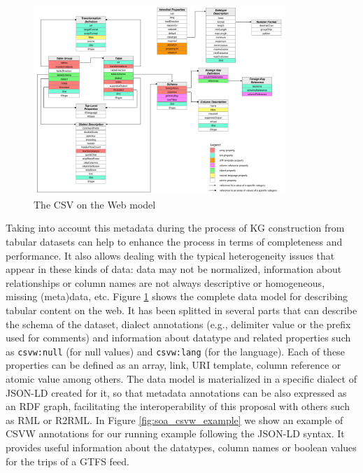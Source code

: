 \begin{figure}[!ht]
\centering
\includegraphics[width=0.85\textwidth]{figures/state-of-the-art/csvw-model.png}
\caption{The CSV on the Web model~\citep{tennison2015model}}
\label{fig:soa_csvw}
\end{figure}


Taking into account this metadata during the process of KG construction from tabular datasets can help to enhance the process in terms of completeness and performance. It also allows dealing with the typical heterogeneity issues that appear in these kinds of data: data may not be normalized, information about relationships or column names are not always descriptive or homogeneous, missing (meta)data, etc. Figure \ref{fig:soa_csvw} shows the complete data model for describing tabular content on the web. It has been splitted in several parts that can describe the schema of the dataset, dialect annotations (e.g., delimiter value or the prefix used for comments) and information about datatype and related properties such as \texttt{csvw:null} (for null values) and \texttt{csvw:lang} (for the language). Each of these properties can be defined as an array, link, URI template, column reference or atomic value among others. The data model is materialized in a specific dialect of JSON-LD created for it, so that metadata annotations can be also expressed as an RDF graph, facilitating the interoperability of this proposal with others such as RML or R2RML. In Figure \ref{fig:soa_csvw_example} we show an example of CSVW annotations for our running example following the JSON-LD syntax. It provides useful information about the datatypes, column names or boolean values for the trips of a GTFS feed.

